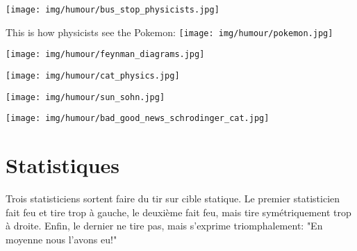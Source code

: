 	\begin{center}
	\texttt{[image: img/humour/bus\_stop\_physicists.jpg]}
	\end{center}
	
	\begin{center}\underline{\hspace{5 cm}}\end{center}
	
	\begin{center}
		This is how physicists see the Pokemon:
		\texttt{[image: img/humour/pokemon.jpg]}
	\end{center}
	
	\begin{center}
	\texttt{[image: img/humour/feynman\_diagrams.jpg]}
	\end{center}
	
	\begin{center}\underline{\hspace{5 cm}}\end{center}
	
	\begin{center}
	\texttt{[image: img/humour/cat\_physics.jpg]}
	\end{center}
	
	\begin{center}\underline{\hspace{5 cm}}\end{center}
	
	\begin{center}
	\texttt{[image: img/humour/sun\_sohn.jpg]}
	\end{center}
	
	\begin{center}\underline{\hspace{5 cm}}\end{center}
	
	\begin{center}
	\texttt{[image: img/humour/bad\_good\_news\_schrodinger\_cat.jpg]}
	\end{center}
	

	\pagebreak
	\section{Statistiques}

Trois statisticiens sortent faire du tir sur cible statique. Le premier statisticien fait feu et tire trop à gauche, le deuxième fait feu, mais tire symétriquement trop à droite. Enfin, le dernier ne tire pas, mais s'exprime triomphalement: "En moyenne nous l'avons eu!"

